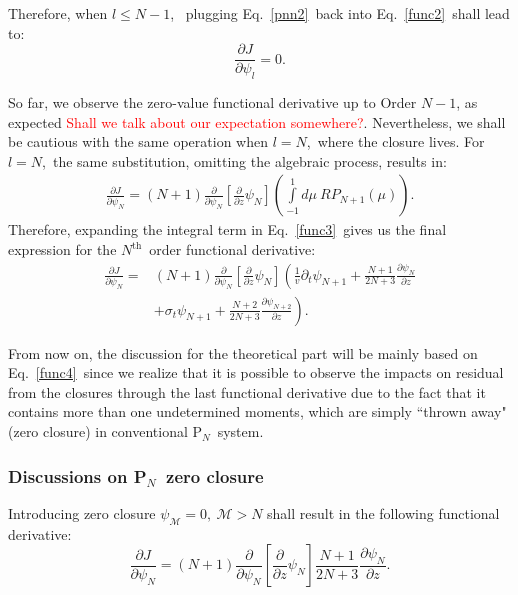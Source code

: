 \documentclass[review]{elsarticle}
\newcommand{\pn}{P$_N$}
\newcommand{\psii}[1]{\psi_\ensuremath{{#1}}}
\begin{document}
Therefore, when $l\leq N-1$,~
plugging Eq.~\eqref{pnn2}~back into Eq.~\eqref{func2}~shall lead to:
\begin{equation}
\frac{\partial J}{\partial\psii{l}}=0.
\end{equation}

So far, we observe the zero-value functional derivative up to Order $N-1$, as expected \textcolor{red}{Shall we talk about our expectation somewhere?}. Nevertheless, we shall be cautious with the same operation when $l=N$,~where the closure lives. 
For $l=N$,~the same substitution, omitting the algebraic process, results in:
\begin{align}\label{func3}
\frac{\partial J}{\partial\psii{N}}=(N+1)
\frac{\partial}{\partial\psii{N}}\left[\frac{\partial}{\partial z}\psii{N}\right]
\left(\int\limits_{-1}^{1}d\mu~RP_{N+1}(\mu)\right).
\end{align}
Therefore, expanding the integral term in Eq.~\eqref{func3}~gives us the final expression for the $N^\mathrm{th}$~order functional derivative:
\begin{align}\label{func4}
\frac{\partial J}{\partial\psii{N}}=&(N+1)
\frac{\partial}{\partial\psii{N}}\left[\frac{\partial}{\partial z}\psii{N}\right]
\left(\frac{1}{v}\partial_t\psi_{N+1}+\frac{N+1}{2N+3}\frac{\partial\psi_{N}}{\partial z}\right.\\\nonumber
&\left.+\sigma_{t}\psi_{N+1}+\frac{N+2}{2N+3}\frac{\partial\psi_{N+2}}{\partial z}\right).
\end{align}

From now on, the discussion for the theoretical part will be mainly based on Eq.~\eqref{func4}~since we realize that it is possible to observe the impacts on residual from the closures through the last functional derivative due to the fact that it contains more than one undetermined moments, which are simply ``thrown away" (zero closure) in conventional \pn~system.

\subsubsection{Discussions on \pn~zero closure}
Introducing zero closure $\psii{\mathcal{M}}=0,~\mathcal{M}>N$ shall result in the following functional derivative:
\begin{equation}\label{bd}
\frac{\partial J}{\partial\psii{N}}=(N+1)
\frac{\partial}{\partial\psii{N}}\left[\frac{\partial}{\partial z}\psii{N}\right]
\frac{N+1}{2N+3}\frac{\partial\psi_{N}}{\partial z}
.
\end{equation}
\end{document}

